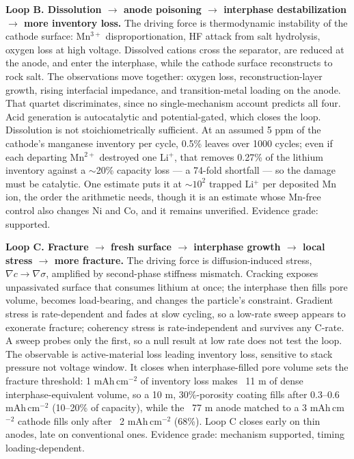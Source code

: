 \documentclass[AMA,Times2COL]{WileyNJDv5}
\begin{document}
\textbf{Loop B. Dissolution $\rightarrow$ anode poisoning $\rightarrow$ interphase destabilization $\rightarrow$ more inventory loss.} The driving force is thermodynamic instability of the cathode surface: Mn$^{3+}$ disproportionation, HF attack from salt hydrolysis, oxygen loss at high voltage.\cite{tesfamhret2023role,sharifiasl2019oxygen,huang2021understanding} Dissolved cations cross the separator, are reduced at the anode, and enter the interphase, while the cathode surface reconstructs to rock salt. The observations move together: oxygen loss, reconstruction-layer growth, rising interfacial impedance, and transition-metal loading on the anode.\cite{tornheim2026quantifying,gilbert2017transition} That quartet discriminates, since no single-mechanism account predicts all four. Acid generation is autocatalytic and potential-gated, which closes the loop. Dissolution is not stoichiometrically sufficient. At an assumed 5 ppm of the cathode's manganese inventory per cycle, 0.5\% leaves over 1000 cycles; even if each departing Mn$^{2+}$ destroyed one Li$^{+}$, that removes 0.27\% of the lithium inventory against a $\sim$20\% capacity loss --- a 74-fold shortfall --- so the damage must be catalytic. One estimate puts it at $\sim 10^{2}$ trapped Li$^{+}$ per deposited Mn ion, the order the arithmetic needs, though it is an estimate whose Mn-free control also changes Ni and Co, and it remains unverified.\cite{gilbert2017transition} Evidence grade: supported.

\textbf{Loop C. Fracture $\rightarrow$ fresh surface $\rightarrow$ interphase growth $\rightarrow$ local stress $\rightarrow$ more fracture.} The driving force is diffusion-induced stress, $\nabla c \rightarrow \nabla\sigma$, amplified by second-phase stiffness mismatch.\cite{woodford2010electrochemical,pandurangi2023chemo,deshpande2017modeling} Cracking exposes unpassivated surface that consumes lithium at once; the interphase then fills pore volume, becomes load-bearing, and changes the particle's constraint.\cite{ai2022coupled,carelli2022coupling} Gradient stress is rate-dependent and fades at slow cycling, so a low-rate sweep appears to exonerate fracture; coherency stress is rate-independent and survives any C-rate. A sweep probes only the first, so a null result at low rate does not test the loop. The observable is active-material loss leading inventory loss, sensitive to stack pressure not voltage window. It closes when interphase-filled pore volume sets the fracture threshold: 1 mAh\,cm$^{-2}$ of inventory loss makes ~11 \textmu m of dense interphase-equivalent volume, so a 10 \textmu m, 30\%-porosity coating fills after 0.3--0.6 mAh\,cm$^{-2}$ (10--20\% of capacity), while the ~77 \textmu m anode matched to a 3 mAh\,cm$^{-2}$ cathode fills only after ~2 mAh\,cm$^{-2}$ (68\%). Loop C closes early on thin anodes, late on conventional ones. Evidence grade: mechanism supported, timing loading-dependent.
\end{document}
